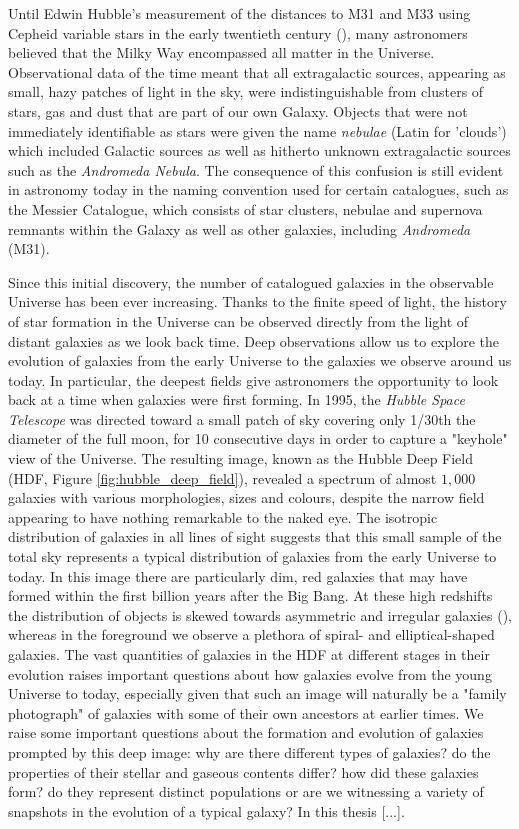 Until Edwin Hubble's measurement of the distances to M31 and M33 using Cepheid variable stars in the early twentieth century (\citealt{Hubble_1925}), many astronomers believed that the Milky Way encompassed all matter in the Universe. Observational data of the time meant that all extragalactic sources, appearing as small, hazy patches of light in the sky, were indistinguishable from clusters of stars, gas and dust that are part of our own Galaxy. Objects that were not immediately identifiable as stars were given the name \textit{nebulae} (Latin for 'clouds') which included Galactic sources as well as hitherto unknown extragalactic sources such as the \textit{Andromeda Nebula}. The consequence of this confusion is still evident in astronomy today in the naming convention used for certain catalogues, such as the Messier Catalogue, which consists of star clusters, nebulae and supernova remnants within the Galaxy as well as other galaxies, including \textit{Andromeda} (M31).

Since this initial discovery, the number of catalogued galaxies in the observable Universe has been ever increasing. Thanks to the finite speed of light, the history of star formation in the Universe can be observed directly from the light of distant galaxies as we look back time. Deep observations allow us to explore the evolution of galaxies from the early Universe to the galaxies we observe around us today. In particular, the deepest fields give astronomers the opportunity to look back at a time when galaxies were first forming. In 1995, the \textit{Hubble Space Telescope} was directed toward a small patch of sky covering only 1/30th the diameter of the full moon, for 10 consecutive days in order to capture a "keyhole" view of the Universe. The resulting image, known as the Hubble Deep Field (HDF, Figure \ref{fig:hubble_deep_field}), revealed a spectrum of almost $1,000$ galaxies with various morphologies, sizes and colours, despite the narrow field appearing to have nothing remarkable to the naked eye. The isotropic distribution of galaxies in all lines of sight suggests that this small sample of the total sky represents a typical distribution of galaxies from the early Universe to today. In this image there are particularly dim, red galaxies that may have formed within the first billion years after the Big Bang. At these high redshifts the distribution of objects is skewed towards asymmetric and irregular galaxies (\citealt{Abraham_1996}), whereas in the foreground we observe a plethora of spiral- and elliptical-shaped galaxies. The vast quantities of galaxies in the HDF at different stages in their evolution raises important questions about how galaxies evolve from the young Universe to today, especially given that such an image will naturally be a "family photograph" of galaxies with some of their own ancestors at earlier times. We raise some important questions about the formation and evolution of galaxies prompted by this deep image: why are there different types of galaxies? do the properties of their stellar and gaseous contents differ? how did these galaxies form? do they represent distinct populations or are we witnessing a variety of snapshots in the evolution of a typical galaxy? In this thesis {\color{red}[...]}.

